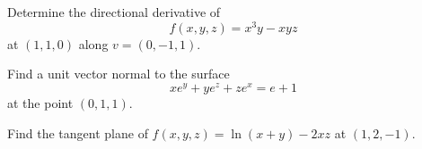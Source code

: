 \documentclass[openany]{book}
\begin{document}
\begin{prob}
    Determine the directional derivative of 
    \begin{equation*}
        f(x,y,z)=x^3y-xyz
    \end{equation*}
    at $(1,1,0)$ along $v=(0,-1,1)$.
\end{prob}





\begin{prob}
    Find a unit vector normal to the surface
    \[xe^y+ye^z+ze^x=e+1\]
    at the point $(0,1,1)$. %
\end{prob}






\begin{prob}
    Find the tangent plane of $f(x,y,z)=\ln(x+y)-2xz$ at $(1,2,-1)$.
\end{prob}
\end{document}
